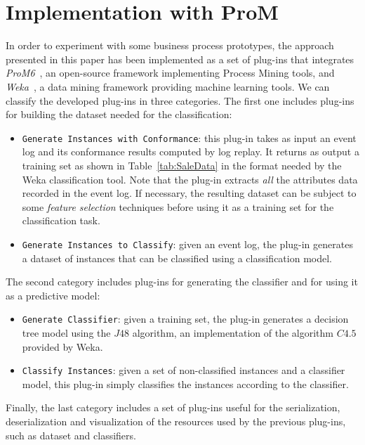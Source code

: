 \documentclass{llncs}
\begin{document}
{

\section{Implementation with ProM}\label{implementation}
In order to experiment with some business process prototypes, the approach presented in this paper has been implemented as a set of plug-ins that integrates \emph{ProM6}~\cite{DBLP:conf/bpm/AalstDGRVW09}, an open-source framework implementing Process Mining tools, and \emph{Weka}~\cite{DBLP:journals/sigkdd/HallFHPRW09}, a data mining framework providing machine learning tools.
We can classify the developed plug-ins in three categories. The first one includes plug-ins for building the dataset needed for the classification:
\begin{itemize}
\item \texttt{Generate Instances with Conformance}: this plug-in takes as input an event log and its conformance results computed by log replay. It returns as output a training set as shown in Table~\ref{tab:SaleData} in the format needed by the Weka classification tool. Note that the plug-in extracts \emph{all} the attributes data recorded in the event log. If necessary, the resulting dataset can be subject to some \emph{feature selection} techniques before using it as a training set for the classification task.  

\item \texttt{Generate Instances to Classify}: given an event log, the plug-in generates a dataset of instances that can be classified using a classification model.
\end{itemize}
The second category includes plug-ins for generating the classifier and for using it as a predictive model:
\begin{itemize}
\item \texttt{Generate Classifier}: given a training set, the plug-in generates a decision tree model using the $J48$ algorithm, an implementation of the algorithm $C4.5$ provided by Weka.
\item \texttt{Classify Instances}: given a set of non-classified instances and a classifier model, this plug-in simply classifies the instances according to the classifier.
\end{itemize}
Finally, the last category includes a set of plug-ins useful for the serialization, deserialization and visualization of the resources used by the previous plug-ins, such as dataset and classifiers. 

}
\end{document}

